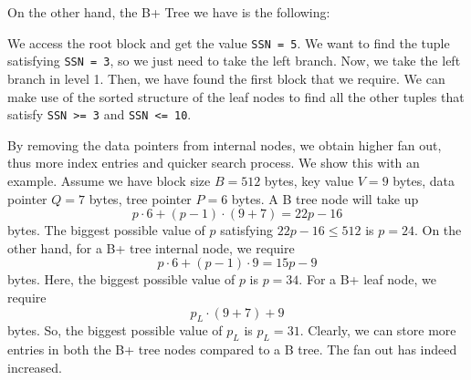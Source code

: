 \documentclass[a4paper, openany]{memoir}
\newcommand{\bplusinternalnodesng}[3]{
    \draw (0+#1, 0+#2) -- (5*0.75+#1, 0+#2)
    -- (5*0.75+#1, 0.5+#2) 
    -- (0+#1, 0.5+#2)
    -- cycle;
    \foreach \i in {1, 2, 3, 4} {
        \draw (\i*0.75+#1, 0+#2) -- (\i*0.75+#1, 0.5+#2);
    }
    \foreach \i in {0, 2} {
        \draw[fill=black] (\i*0.75+0.75/2+#1, 0.25+#2) circle (2pt);
    }
    \foreach \x[count=\i] in {#3} {
        \node at (\i*0.75*2-0.75+0.75/2+#1, 0.25+#2) {\texttt{\x}};
    }
}
\newcommand{\bplusinternalnodedbl}[3]{
    \draw (0+#1, 0+#2) -- (5*0.75+#1, 0+#2)
    -- (5*0.75+#1, 0.5+#2) 
    -- (0+#1, 0.5+#2)
    -- cycle;
    \foreach \i in {1, 2, 3, 4} {
        \draw (\i*0.75+#1, 0+#2) -- (\i*0.75+#1, 0.5+#2);
    }
    \foreach \i in {0, 2, 4} {
        \draw[fill=black] (\i*0.75+0.75/2+#1, 0.25+#2) circle (2pt);
    }
    \foreach \x[count=\i] in {#3} {
        \node at (\i*0.75*2-0.75+0.75/2+#1, 0.25+#2) {\texttt{\x}};
    }
}
\newcommand{\bplusleafnodedbl}[3]{
    \draw (0+#1, 0+#2) -- (2+#1, 0+#2)
    -- (2+#1, 0.5+#2)
    -- (0+#1, 0.5+#2)
    -- cycle;

    \draw (1+#1, 0+#2) -- (1+#1, 0.5+#2);

    \foreach \x[count=\i] in {#3} {
        \filldraw[red] (\i-0.25+#1, 0.25+#2) circle (2pt);
        \node at (\i-0.75+#1, 0.25+#2) {\texttt{\x}};
    }
}
\newcommand{\bplusleafnodesng}[3]{
    \draw (0+#1, 0+#2) -- (1+#1, 0+#2)
    -- (1+#1, 0.5+#2)
    -- (0+#1, 0.5+#2)
    -- cycle;

    \filldraw[red] (0.75+#1, 0.25+#2) circle (2pt);
    \node at (0.25+#1, 0.25+#2) {\texttt{#3}};
}
\begin{document}
On the other hand, the B+ Tree we have is the following:
\begin{figure}[H]
    \centering
\end{figure}
\noindent We access the root block and get the value \texttt{SSN = 5}. We want to find the tuple satisfying \texttt{SSN = 3}, so we just need to take the left branch. Now, we take the left branch in level 1. Then, we have found the first block that we require. We can make use of the sorted structure of the leaf nodes to find all the other tuples that satisfy \texttt{SSN >= 3} and \texttt{SSN <= 10}.

By removing the data pointers from internal nodes, we obtain higher fan out, thus more index entries and quicker search process. We show this with an example. Assume we have block size $B = 512$ bytes, key value $V = 9$ bytes, data pointer $Q = 7$ bytes, tree pointer $P = 6$ bytes. A B tree node will take up
\[p \cdot 6 + (p-1) \cdot (9+7) = 22p - 16\]
bytes. The biggest possible value of $p$ satisfying $22p - 16 \leq 512$ is $p = 24$. On the other hand, for a B+ tree internal node, we require
\[p \cdot 6 + (p-1) \cdot 9 = 15p - 9\]
bytes. Here, the biggest possible value of $p$ is $p = 34$. For a B+ leaf node, we require
\[p_L \cdot (9 + 7) + 9\]
bytes. So, the biggest possible value of $p_L$ is $p_L = 31$. Clearly, we can store more entries in both the B+ tree nodes compared to a B tree. The fan out has indeed increased.
\end{document}
